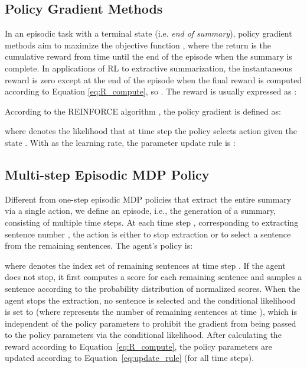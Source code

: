 \documentclass[11pt]{article}
\begin{document}
\subsection{Policy Gradient Methods}




In an episodic task with a terminal state (i.e. \textit{end of summary}), policy gradient methods aim to maximize the objective function  , where the return  is the cumulative reward from time  until the end of the episode when the summary is complete. In applications of RL to extractive summarization, the instantaneous reward  is zero except at the end of the episode when the final reward  is computed according to Equation \eqref{eq:R_compute}, so . The reward  is usually expressed as
\cite{dong2018banditsum}:

According to the REINFORCE algorithm \cite{williams1992simple}, the policy gradient is defined as:

where  denotes the likelihood that at time step  the policy   selects action  given the state .
With  as the learning rate, the parameter update rule is \cite{sutton2018}:



\subsection{Multi-step Episodic MDP Policy}

Different from one-step episodic MDP policies \cite{narayan2018ranking,dong2018banditsum,luo2019reading} that extract the entire summary via a single action, we define an episode, i.e., the generation of a summary, consisting of multiple time steps. At each time step , corresponding to extracting sentence number , the action  is either to stop extraction or to select a sentence  from the remaining sentences. The agent's policy is:

where  denotes the index set of remaining sentences at time step . If the agent does not stop, it first computes a score  for each remaining sentence and samples a sentence  according to the probability distribution of normalized scores. 
When the agent stops the extraction, no sentence is selected and the conditional likelihood  is set to  (where  represents the number of remaining sentences at time ), which is independent of the policy parameters to prohibit the gradient from being passed to the policy parameters via the conditional likelihood. After calculating the reward according to Equation~\eqref{eq:R_compute}, the policy parameters are updated according to Equation~\eqref{eq:update_rule} (for all time steps).
\end{document}
